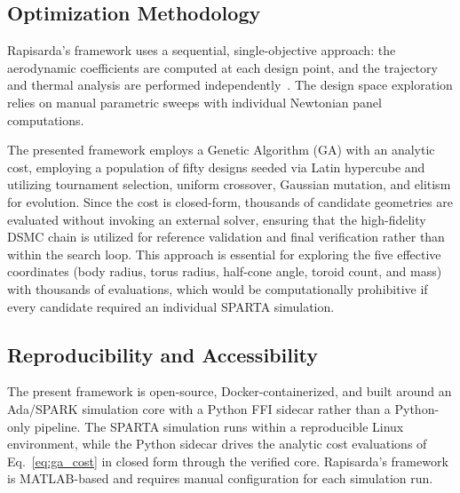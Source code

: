 \subsection{Optimization Methodology}
Rapisarda's framework uses a sequential, single-objective approach: the aerodynamic coefficients are computed at each design point, and the trajectory and thermal analysis are performed independently~\cite{rapisarda2023mdao}. The design space exploration relies on manual parametric sweeps with individual Newtonian panel computations.

The presented framework employs a Genetic Algorithm (GA) with an analytic cost, employing a population of fifty designs seeded via Latin hypercube and utilizing tournament selection, uniform crossover, Gaussian mutation, and elitism for evolution. Since the cost is closed-form, thousands of candidate geometries are evaluated without invoking an external solver, ensuring that the high-fidelity DSMC chain is utilized for reference validation and final verification rather than within the search loop. This approach is essential for exploring the five effective coordinates (body radius, torus radius, half-cone angle, toroid count, and mass) with thousands of evaluations, which would be computationally prohibitive if every candidate required an individual SPARTA simulation.


\subsection{Reproducibility and Accessibility}
The present framework is open-source, Docker-containerized, and built around an Ada/SPARK simulation core with a Python FFI sidecar rather than a Python-only pipeline. The SPARTA simulation runs within a reproducible Linux environment, while the Python sidecar drives the analytic cost evaluations of Eq.~\eqref{eq:ga_cost} in closed form through the verified core. Rapisarda's framework is MATLAB-based and requires manual configuration for each simulation run.


